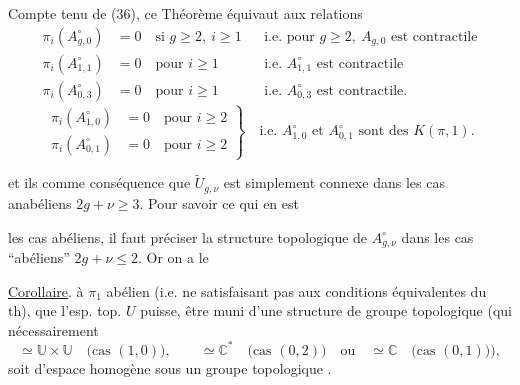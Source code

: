 Compte tenu de (36), ce Théorème équivaut aux relations
\[
\tag{37}
\begin{aligned}
\pi_i(A_{g,0}^{\circ})&=0\quad\text{si }g\geq2,\ i\geq1
&&\text{i.e. pour }g\geq2,\ A_{g,0}\text{ est contractile}\\
\pi_i(A_{1,1}^{\circ})&=0\quad\text{pour }i\geq1
&&\text{i.e. }A_{1,1}^{\circ}\text{ est contractile}\\
\pi_i(A_{0,3}^{\circ})&=0\quad\text{pour }i\geq1
&&\text{i.e. }A_{0,3}^{\circ}\text{ est contractile}.
\end{aligned}
\]
\[
\tag{38}
\left.\begin{aligned}
\pi_i(A_{1,0}^{\circ})&=0\quad\text{pour }i\geq2\\
\pi_i(A_{0,1}^{\circ})&=0\quad\text{pour }i\geq2
\end{aligned}\right\}
\quad\text{i.e. }A_{1,0}^{\circ}\text{ et }A_{0,1}^{\circ}\text{ sont des }K(\pi,1).
\]

et ils  comme conséquence que $\widetilde U_{g,\nu}$ est simplement connexe dans les cas anabéliens $2g+\nu\geq3$. Pour savoir ce qui en est

 les cas abéliens, il faut préciser la structure topologique de $A_{g,\nu}^{\circ}$ dans les  cas ``abéliens'' $2g+\nu\leq2$. Or on a le

\uline{Corollaire}.   à $\pi_1$ abélien (i.e. ne satisfaisant pas aux conditions équivalentes du th),  que l'esp. top. $U$  puisse,  être muni d'une structure de groupe topologique (qui  nécessairement
\[
\simeq\mathbb U\times\mathbb U\quad\text{(cas }(1,0)\text{)},\qquad
\simeq\mathbb C^*\quad\text{(cas }(0,2)\text{)}\quad\text{ou}\quad
\simeq\mathbb C\quad\text{(cas }(0,1)\text{)}),
\]
soit  d'espace homogène sous un groupe topologique .

